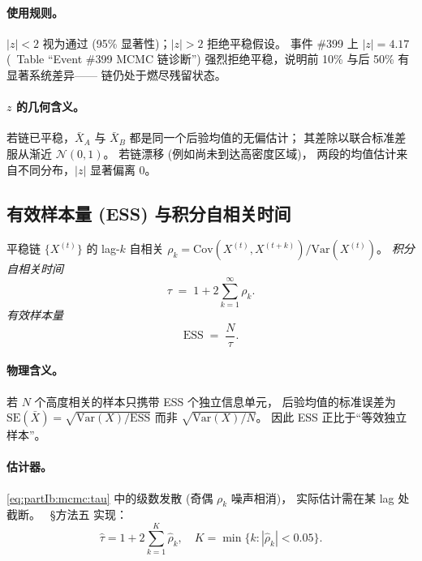 \paragraph{使用规则。}
$|z|<2$ 视为通过 (95\% 显著性)；$|z|>2$ 拒绝平稳假设。
事件 \#399 上 $|z|=4.17$ (\StatusReport\ Table “Event \#399 MCMC 链诊断”)
强烈拒绝平稳，说明前 10\% 与后 50\% 有显著系统差异——
链仍处于燃尽残留状态。

\paragraph{$z$ 的几何含义。}
若链已平稳，$\bar X_A$ 与 $\bar X_B$ 都是同一个后验均值的无偏估计；
其差除以联合标准差服从渐近 $\mathcal N(0,1)$。
若链漂移 (例如尚未到达高密度区域)，
两段的均值估计来自不同分布，$|z|$ 显著偏离 0。

\subsection{有效样本量 (ESS) 与积分自相关时间}
\label{sec:partIb:mcmc:ess}

\begin{definition}
\label{def:partIb:tau}
平稳链 $\{X^{(t)}\}$ 的 lag-$k$ 自相关
$\rho_k=\mathrm{Cov}(X^{(t)},X^{(t+k)})/\mathrm{Var}(X^{(t)})$。
\emph{积分自相关时间}
\begin{equation}
  \tau \;=\; 1+2\sum_{k=1}^{\infty}\rho_k.
  \label{eq:partIb:mcmc:tau}
\end{equation}
\emph{有效样本量}
\begin{equation}
  \mathrm{ESS}\;=\;\frac{N}{\tau}.
  \label{eq:partIb:mcmc:ess_def}
\end{equation}
\end{definition}

\paragraph{物理含义。}
若 $N$ 个高度相关的样本只携带 ESS 个独立信息单元，
后验均值的标准误差为
$\mathrm{SE}(\bar X)=\sqrt{\mathrm{Var}(X)/\mathrm{ESS}}$
而非 $\sqrt{\mathrm{Var}(X)/N}$。
因此 ESS 正比于“等效独立样本”。

\paragraph{估计器。}
\eqref{eq:partIb:mcmc:tau} 中的级数发散 (奇偶 $\rho_k$ 噪声相消)，
实际估计需在某 lag 处截断。
\StatusReport\ §方法五 实现：
\begin{equation}
  \widehat\tau = 1+2\sum_{k=1}^{K}\hat\rho_k,
  \quad
  K = \min\{k:|\hat\rho_k|<0.05\}.
  \label{eq:partIb:mcmc:tau_estim}
\end{equation}

